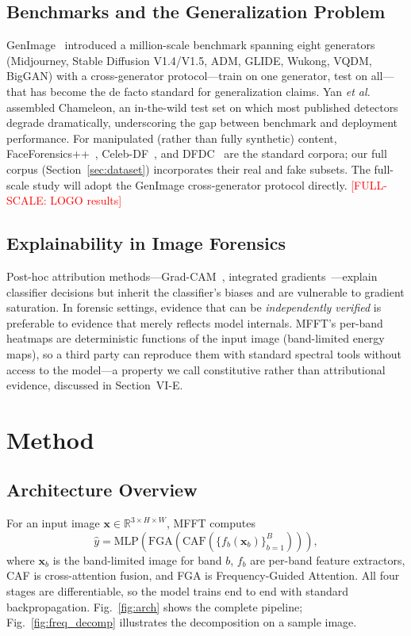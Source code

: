 \documentclass[journal]{IEEEtran}
\newcommand{\fullscale}[1]{\textcolor{red}{[FULL-SCALE: #1]}}
\begin{document}
\subsection{Benchmarks and the Generalization Problem}
GenImage~\cite{zhu2023genimage} introduced a million-scale benchmark spanning eight generators (Midjourney, Stable Diffusion V1.4/V1.5, ADM, GLIDE, Wukong, VQDM, BigGAN) with a cross-generator protocol---train on one generator, test on all---that has become the de facto standard for generalization claims. Yan \textit{et al.}~\cite{yan2025sanity} assembled Chameleon, an in-the-wild test set on which most published detectors degrade dramatically, underscoring the gap between benchmark and deployment performance. For manipulated (rather than fully synthetic) content, FaceForensics++~\cite{rossler2019}, Celeb-DF~\cite{li2020celebdf}, and DFDC~\cite{dolhansky2020} are the standard corpora; our full corpus (Section~\ref{sec:dataset}) incorporates their real and fake subsets. The full-scale study will adopt the GenImage cross-generator protocol directly. \fullscale{LOGO results}

\subsection{Explainability in Image Forensics}
Post-hoc attribution methods---Grad-CAM~\cite{selvaraju2017}, integrated gradients~\cite{sundararajan2017}---explain classifier decisions but inherit the classifier's biases and are vulnerable to gradient saturation. In forensic settings, evidence that can be \emph{independently verified} is preferable to evidence that merely reflects model internals. MFFT's per-band heatmaps are deterministic functions of the input image (band-limited energy maps), so a third party can reproduce them with standard spectral tools without access to the model---a property we call constitutive rather than attributional evidence, discussed in Section~VI-E.

\section{Method}

\subsection{Architecture Overview}
For an input image $\mathbf{x} \in \mathbb{R}^{3 \times H \times W}$, MFFT computes
\begin{equation}
\hat{y} = \mathrm{MLP}\!\left(\mathrm{FGA}\!\left(\mathrm{CAF}\!\left(\{f_b(\mathbf{x}_b)\}_{b=1}^{B}\right)\right)\right),
\label{eq:pipeline}
\end{equation}
where $\mathbf{x}_b$ is the band-limited image for band $b$, $f_b$ are per-band feature extractors, CAF is cross-attention fusion, and FGA is Frequency-Guided Attention. All four stages are differentiable, so the model trains end to end with standard backpropagation. Fig.~\ref{fig:arch} shows the complete pipeline; Fig.~\ref{fig:freq_decomp} illustrates the decomposition on a sample image.
\end{document}
